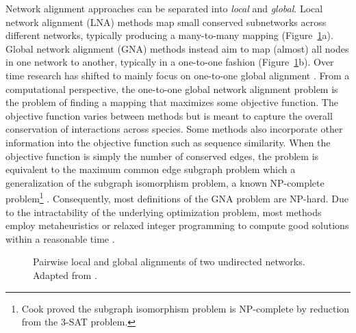Network alignment approaches can be separated into \emph{local} and \emph{global}. Local network alignment (LNA) methods map small conserved subnetworks across different networks, typically producing a many-to-many mapping (Figure~\ref{fig:networkalignment}a). Global network alignment (GNA) methods instead aim to map (almost) all nodes in one network to another, typically in a one-to-one fashion (Figure~\ref{fig:networkalignment}b). Over time research has shifted to mainly focus on one-to-one global alignment \cite{Faisal2015,Guzzi2017}.
From a computational perspective, the one-to-one global network alignment problem is the problem of finding a mapping that maximizes some objective function. The objective function varies between methods but is meant to capture the overall conservation of interactions across species. Some methods also incorporate other information into the objective function such as sequence similarity. When the objective function is simply the number of conserved edges, the problem is equivalent to the maximum common edge subgraph problem which a generalization of the subgraph isomorphism problem, a known NP-complete problem\footnote{Cook proved the subgraph isomorphism problem is NP-complete by reduction from the 3-SAT problem.} \cite{Cook1971}. Consequently, most definitions of the GNA problem are NP-hard. Due to the intractability of the underlying optimization problem, most methods employ metaheuristics or relaxed integer programming to compute good solutions within a reasonable time \cite{Guzzi2017}.
%
\begin{figure}
    \centering
    \hfill
    \caption{Pairwise local and global alignments of two undirected networks. Adapted from \citeauthor{Meng2016} \cite{Meng2016}.}
    \label{fig:networkalignment}
\end{figure}

